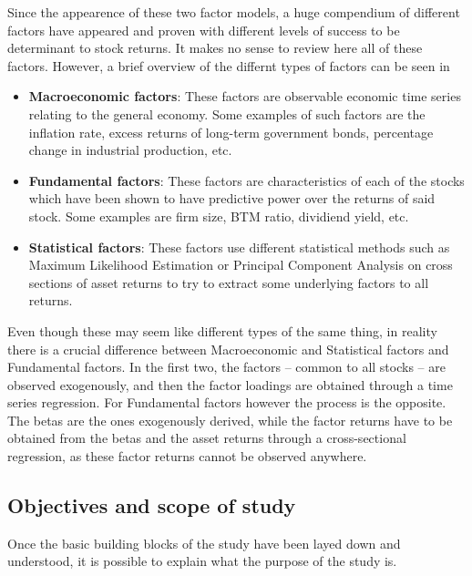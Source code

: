 Since the appearence of these two factor models, a huge compendium of different factors have appeared and proven with different levels of success to be determinant to stock returns. It makes no sense to review here all of these factors. However, a brief overview of the differnt types of factors can be seen in \cite{connor_1995}
\begin{itemize}
    \item \textbf{Macroeconomic factors}: These factors are observable economic time series relating to the general economy. Some examples of such factors are the inflation rate, excess returns of long-term government bonds, percentage change in industrial production, etc. 
    \item \textbf{Fundamental factors}: These factors are characteristics of each of the stocks which have been shown to have predictive power over the returns of said stock. Some examples are firm size, BTM ratio, dividiend yield, etc. 
    \item \textbf{Statistical factors}: These factors use different statistical methods such as Maximum Likelihood Estimation or Principal Component Analysis on cross sections of asset returns to try to extract some underlying factors to all returns. 
\end{itemize}
Even though these may seem like different types of the same thing, in reality there is a crucial difference between Macroeconomic and Statistical factors and Fundamental factors. In the first two, the factors -- common to all stocks -- are observed exogenously, and then the factor loadings are obtained through a time series regression. For Fundamental factors however the process is the opposite. The betas are the ones exogenously derived, while the factor returns have to be obtained from the betas and the asset returns through a cross-sectional regression, as these factor returns cannot be observed anywhere. 
\subsection{Objectives and scope of study}
Once the basic building blocks of the study have been layed down and understood, it is possible to explain what the purpose of the study is. 

